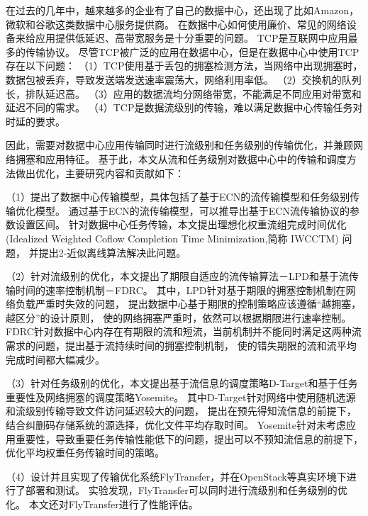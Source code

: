 \begin{cabstract}
在过去的几年中，越来越多的企业有了自己的数据中心，还出现了比如Amazon，微软和谷歌这类数据中心服务提供商。
在数据中心如何使用廉价、常见的网络设备来给应用提供低延迟、高带宽服务是十分重要的问题。
TCP是互联网中应用最多的传输协议。
尽管TCP被广泛的应用在数据中心，但是在数据中心中使用TCP存在以下问题：
（1）TCP使用基于丢包的拥塞检测方法，当网络中出现拥塞时，数据包被丢弃，导致发送端发送速率震荡大，网络利用率低。
（2）交换机的队列长，排队延迟高。
（3）应用的数据流均分网络带宽，不能满足不同应用对带宽和延迟不同的需求。
（4）TCP是数据流级别的传输，难以满足数据中心传输任务对时延的要求。

因此，需要对数据中心应用传输同时进行流级别和任务级别的传输优化，并兼顾网络拥塞和应用特征。
基于此，本文从流和任务级别对数据中心中的传输和调度方法做出优化，主要研究内容和贡献如下：


（1）提出了数据中心传输模型，具体包括了基于ECN的流传输模型和任务级别传输优化模型。
通过基于ECN的流传输模型，可以推导出基于ECN流传输协议的参数设置区间。
针对数据中心任务传输，本文提出理想化权重流组完成时间优化 (Idealized Weighted Coflow Completion Time Minimization,简称 IWCCTM) 问题，
并提出2-近似离线算法解决此问题。


（2）针对流级别的优化，本文提出了期限自适应的流传输算法－LPD和基于流传输时间的速率控制机制－FDRC。
其中，LPD针对基于期限的拥塞控制机制在网络负载严重时失效的问题，
提出数据中心基于期限的控制策略应该遵循“越拥塞，越区分”的设计原则，
使的网络拥塞严重时，依然可以根据期限进行速率控制。
FDRC针对数据中心内存在有期限的流和短流，当前机制并不能同时满足这两种流需求的问题，提出基于流持续时间的拥塞控制机制，
使的错失期限的流和流平均完成时间都大幅减少。

    
（3）针对任务级别的优化，本文提出基于流信息的调度策略D-Target和基于任务重要性及网络拥塞的调度策略Yosemite。
其中D-Target针对网络中使用随机选源和流级别传输导致文件访问延迟较大的问题，
提出在预先得知流信息的前提下，结合纠删码存储系统的源选择，优化文件平均存取时间。
Yosemite针对未考虑应用重要性，导致重要任务传输性能低下的问题，提出可以不预知流信息的前提下，优化平均权重任务传输时间的策略。

（4）设计并且实现了传输优化系统FlyTransfer，并在OpenStack等真实环境下进行了部署和测试。
实验发现，FlyTransfer可以同时进行流级别和任务级别的优化。
本文还对FlyTransfer进行了性能评估。
  
\end{cabstract}

